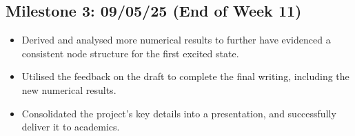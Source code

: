 \documentclass[12pt,a4paper]{amsart}
\begin{document}
\subsection*{Milestone 3: 09/05/25 (End of Week 11)}
\begin{itemize}
    \item Derived and analysed more numerical results to further have evidenced a consistent node structure for the first excited state.
    \item Utilised the feedback on the draft to complete the final writing, including the new numerical results.
    \item Consolidated the project's key details into a presentation, and successfully deliver it to academics. 
\end{itemize}





\end{document}
